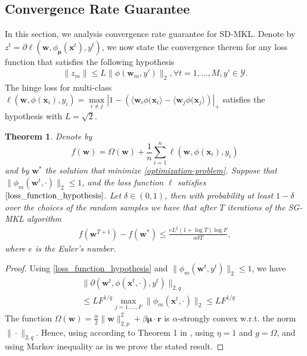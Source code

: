 \documentclass{article}
\newtheorem{theorem}{Theorem}
\begin{document}
\subsection{Convergence Rate Guarantee}
In this section, we analysis convergence rate guarantee for SD-MKL.
Denote by $z^t=\partial\ell(\mathbf{w},\phi_{\bm \mu}(\mathbf{x}^t), y^t)$,
we now state the convergence therem for any loss function that satisfies the following hypothesis
\begin{align}
\label{loss_function_hypothesis}
    \|z_m\| \leq L\|\phi(\mathbf{w}_m, y')\|_2, \forall t =1,\ldots, M, y' \in \mathcal{Y}.
\end{align}
The hinge loss for multi-class $\ell(\mathbf{w},\phi(\mathbf{x}_i), y_i)=
\max\limits_{i \not= j}\left|1-\left(\langle\mathbf{w}_i \phi(\mathbf{x}_i\rangle -\langle\mathbf{w}_j \phi(\mathbf{x}_j\rangle\right)\right|_+$ satisfies the hypothesis with $L=\sqrt{2}$.

\begin{theorem}
Denote by $$f(\mathbf{w})=\Omega(\mathbf{w})+\frac{1}{n}\sum_{i=1}^n\ell(\mathbf{w},\phi(\mathbf{x}_i),y_i)$$
and by $\mathbf{w}^\ast$ the solution that minimize \eqref{optimization-problem}.
Suppose that $\|\phi_m(\mathbf{w}^t,\cdot)\|_2 \leq 1$, and the loss function $\ell$ satisfies $\eqref{loss_function_hypothesis}$.
Let $\delta \in (0,1)$, then with probability at least $1 - \delta$ over the choices of the random samples
we have that after $T$ iterations of the SG-MKL algorithm
\begin{align*}
    f(\mathbf{w}^{T+1})-f(\mathbf{w^\ast}) \leq \frac{eL^2(1+\log T)\log F}{\alpha\delta T},
\end{align*}
where $e$ is the Euler's number.
\end{theorem}
\begin{proof}
Using \eqref{loss_function_hypothesis} and $\|\phi_m(\mathbf{w}^t, y^t)\|_2 \leq 1$, we have
\begin{align*}
    &\|\partial(\mathbf{w}^t,\phi(\mathbf{x}^t,\cdot), y^t)\|_{2,q} \\
    &\leq LF^{1/q} \max_{j=1, \ldots, F} \|\phi_m(\mathbf{x}^t, \cdot)\|_2 \leq LF^{1/q}
\end{align*}
The function $\Omega(\mathbf{w})=\frac{\alpha}{2}\|\mathbf{w}\|_{2,p}^2 + \beta\mathbf{\mu} \cdot \mathbf{r}$ is
 $\alpha$-strongly convex w.r.t. the norm $\|\cdot\|_{2,q}$. Hence, using according to Theorem 1 in \cite{Shalev-ShwartzSS07},
 using $\eta=1$ and $g=\Omega$, and using Markov inequality as in \cite{Shalev-ShwartzSS07} we prove the stated result.
\end{proof}
\end{document}
